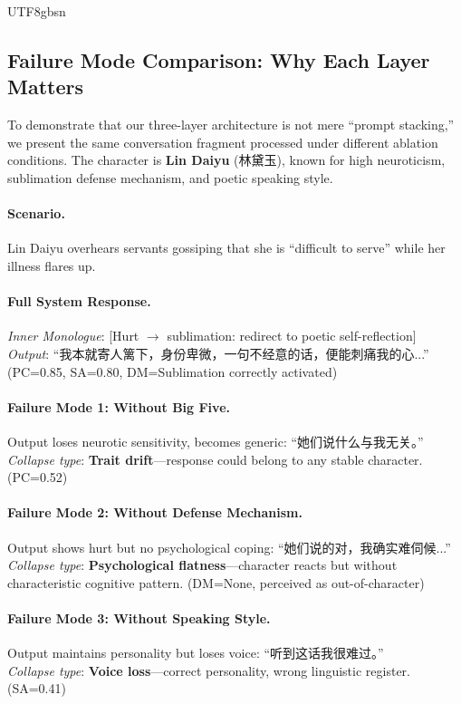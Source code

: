 \documentclass[11pt]{article}
\begin{document}
\begin{CJK*}{UTF8}{gbsn}
\subsection{Failure Mode Comparison: Why Each Layer Matters}
\label{sec:failure_mode_comparison}

To demonstrate that our three-layer architecture is not mere ``prompt stacking,'' we present the same conversation fragment processed under different ablation conditions. The character is \textbf{Lin Daiyu} (林黛玉), known for high neuroticism, sublimation defense mechanism, and poetic speaking style.

\paragraph{Scenario.} Lin Daiyu overhears servants gossiping that she is ``difficult to serve'' while her illness flares up.

\paragraph{Full System Response.}
\textit{Inner Monologue}: [Hurt $\rightarrow$ sublimation: redirect to poetic self-reflection] \\
\textit{Output}: ``我本就寄人篱下，身份卑微，一句不经意的话，便能刺痛我的心...'' (PC=0.85, SA=0.80, DM=Sublimation correctly activated)

\paragraph{Failure Mode 1: Without Big Five.}
Output loses neurotic sensitivity, becomes generic: ``她们说什么与我无关。'' \\
\textit{Collapse type}: \textbf{Trait drift}---response could belong to any stable character. (PC=0.52)

\paragraph{Failure Mode 2: Without Defense Mechanism.}
Output shows hurt but no psychological coping: ``她们说的对，我确实难伺候...'' \\
\textit{Collapse type}: \textbf{Psychological flatness}---character reacts but without characteristic cognitive pattern. (DM=None, perceived as out-of-character)

\paragraph{Failure Mode 3: Without Speaking Style.}
Output maintains personality but loses voice: ``听到这话我很难过。'' \\
\textit{Collapse type}: \textbf{Voice loss}---correct personality, wrong linguistic register. (SA=0.41)


\end{CJK*}
\end{document}

